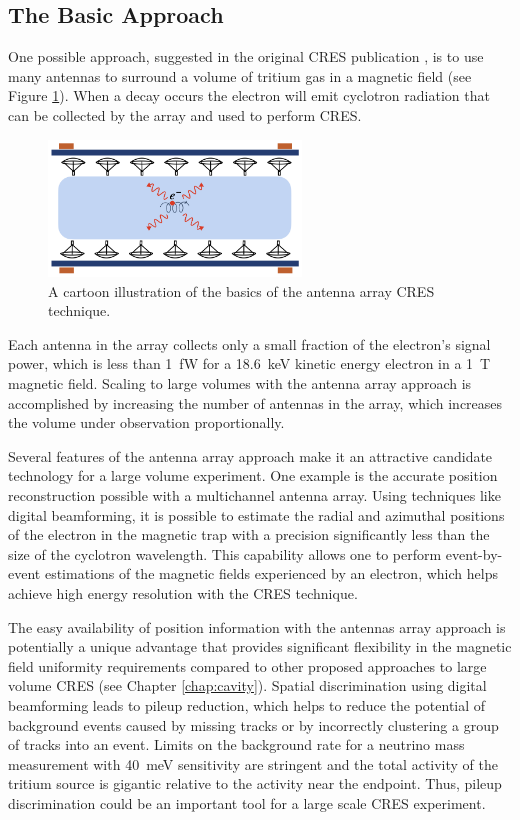 \subsection{The Basic Approach}

One possible approach, suggested in the original CRES publication \cite{p8originalcres}, is to use many antennas to surround a volume of tritium gas in a magnetic field (see Figure \ref{fig:chap3-antenna-concept-cartoon}). When a decay occurs the electron will emit cyclotron radiation that can be collected by the array and used to perform CRES.
\begin{figure}[htbp]
    \centering
    \includegraphics*[width=0.6\textwidth]{figs/Chapter-3/230614_antenna_cartoon.png}
    \caption{\label{fig:chap3-antenna-concept-cartoon} A cartoon illustration of the basics of the antenna array CRES technique.}
\end{figure}
Each antenna in the array collects only a small fraction of the electron's signal power, which is less than 1~fW for a 18.6~keV kinetic energy electron in a 1~T magnetic field. Scaling to large volumes with the antenna array approach is accomplished by increasing the number of antennas in the array, which increases the volume under observation proportionally. 

Several features of the antenna array approach make it an attractive candidate technology for a large volume experiment. One example is the accurate position reconstruction possible with a multichannel antenna array. Using techniques like digital beamforming, it is possible to estimate the radial and azimuthal positions of the electron in the magnetic trap with a precision significantly less than the size of the cyclotron wavelength. This capability allows one to perform event-by-event estimations of the magnetic fields experienced by an electron, which helps achieve high energy resolution with the CRES technique.

The easy availability of position information with the antennas array approach is potentially a unique advantage that provides significant flexibility in the magnetic field uniformity requirements compared to other proposed approaches to large volume CRES (see Chapter \ref{chap:cavity}). Spatial discrimination using digital beamforming leads to pileup reduction, which helps to reduce the potential of background events caused by missing tracks or by incorrectly clustering a group of tracks into an event. Limits on the background rate for a neutrino mass measurement with 40~meV sensitivity are stringent and the total activity of the tritium source is gigantic relative to the activity near the endpoint. Thus, pileup discrimination could be an important tool for a large scale CRES experiment.


